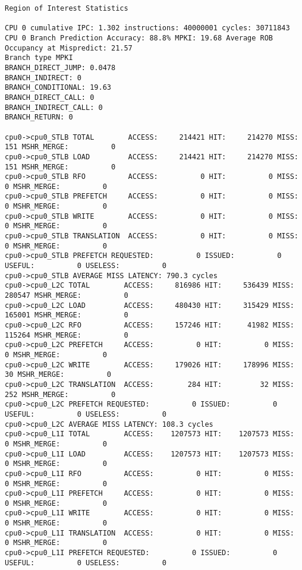 \documentclass[17pt]{article}
\begin{document}
\begin{LTR}
\begin{lstlisting}[basicstyle=\tiny\ttfamily]
Region of Interest Statistics

CPU 0 cumulative IPC: 1.302 instructions: 40000001 cycles: 30711843
CPU 0 Branch Prediction Accuracy: 88.8% MPKI: 19.68 Average ROB Occupancy at Mispredict: 21.57
Branch type MPKI
BRANCH_DIRECT_JUMP: 0.0478
BRANCH_INDIRECT: 0
BRANCH_CONDITIONAL: 19.63
BRANCH_DIRECT_CALL: 0
BRANCH_INDIRECT_CALL: 0
BRANCH_RETURN: 0

cpu0->cpu0_STLB TOTAL        ACCESS:     214421 HIT:     214270 MISS:        151 MSHR_MERGE:          0
cpu0->cpu0_STLB LOAD         ACCESS:     214421 HIT:     214270 MISS:        151 MSHR_MERGE:          0
cpu0->cpu0_STLB RFO          ACCESS:          0 HIT:          0 MISS:          0 MSHR_MERGE:          0
cpu0->cpu0_STLB PREFETCH     ACCESS:          0 HIT:          0 MISS:          0 MSHR_MERGE:          0
cpu0->cpu0_STLB WRITE        ACCESS:          0 HIT:          0 MISS:          0 MSHR_MERGE:          0
cpu0->cpu0_STLB TRANSLATION  ACCESS:          0 HIT:          0 MISS:          0 MSHR_MERGE:          0
cpu0->cpu0_STLB PREFETCH REQUESTED:          0 ISSUED:          0 USEFUL:          0 USELESS:          0
cpu0->cpu0_STLB AVERAGE MISS LATENCY: 790.3 cycles
cpu0->cpu0_L2C TOTAL        ACCESS:     816986 HIT:     536439 MISS:     280547 MSHR_MERGE:          0
cpu0->cpu0_L2C LOAD         ACCESS:     480430 HIT:     315429 MISS:     165001 MSHR_MERGE:          0
cpu0->cpu0_L2C RFO          ACCESS:     157246 HIT:      41982 MISS:     115264 MSHR_MERGE:          0
cpu0->cpu0_L2C PREFETCH     ACCESS:          0 HIT:          0 MISS:          0 MSHR_MERGE:          0
cpu0->cpu0_L2C WRITE        ACCESS:     179026 HIT:     178996 MISS:         30 MSHR_MERGE:          0
cpu0->cpu0_L2C TRANSLATION  ACCESS:        284 HIT:         32 MISS:        252 MSHR_MERGE:          0
cpu0->cpu0_L2C PREFETCH REQUESTED:          0 ISSUED:          0 USEFUL:          0 USELESS:          0
cpu0->cpu0_L2C AVERAGE MISS LATENCY: 108.3 cycles
cpu0->cpu0_L1I TOTAL        ACCESS:    1207573 HIT:    1207573 MISS:          0 MSHR_MERGE:          0
cpu0->cpu0_L1I LOAD         ACCESS:    1207573 HIT:    1207573 MISS:          0 MSHR_MERGE:          0
cpu0->cpu0_L1I RFO          ACCESS:          0 HIT:          0 MISS:          0 MSHR_MERGE:          0
cpu0->cpu0_L1I PREFETCH     ACCESS:          0 HIT:          0 MISS:          0 MSHR_MERGE:          0
cpu0->cpu0_L1I WRITE        ACCESS:          0 HIT:          0 MISS:          0 MSHR_MERGE:          0
cpu0->cpu0_L1I TRANSLATION  ACCESS:          0 HIT:          0 MISS:          0 MSHR_MERGE:          0
cpu0->cpu0_L1I PREFETCH REQUESTED:          0 ISSUED:          0 USEFUL:          0 USELESS:          0

\end{lstlisting}
\end{LTR}
\end{document}
